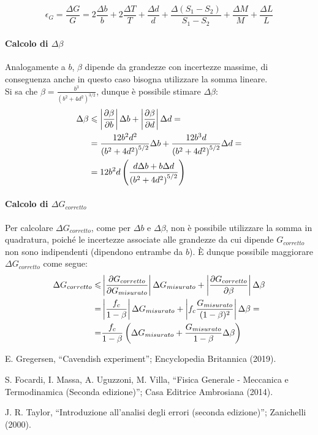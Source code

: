 \documentclass{article}
\newcommand{\quotes}[1]{``#1''}
\newcommand{\abs}[1]{\left| #1 \right|}
\begin{document}
\begin{equation}
    \epsilon_G = \frac{\Delta G}{G} = 2 \frac{\Delta b}{b} + 2 \frac{\Delta T}{T} + \frac{\Delta d}{d} + \frac{\Delta \left( S_1 - S_2 \right)}{S_1 - S_2} + \frac{\Delta M}{M} + \frac{\Delta L}{L}
\end{equation}

\paragraph{Calcolo di $\Delta \beta$}
Analogamente a $b$, $\beta$ dipende da grandezze con incertezze massime, di conseguenza anche in questo caso bisogna utilizzare la somma lineare\cite{taylor}.\\
Si sa che $\displaystyle \beta = \frac{b ^ 3}{\left( b ^ 2 + 4 d ^ 2 \right) ^ {3 / 2}}$, dunque è possibile stimare $\Delta \beta$:
\begin{align}
    \Delta \beta &\leqslant \abs{\frac{\partial \beta}{\partial b}} \Delta b + \abs{\frac{\partial \beta}{\partial d}} \Delta d =\notag\\
    &= \frac{12 b ^ 2 d ^ 2}{\left(b ^ 2 + 4 d ^ 2\right) ^ {5 / 2}} \Delta b + \frac{12 b ^ 3 d}{\left(b ^ 2 + 4 d ^ 2\right) ^ {5 / 2}} \Delta d =\notag\\
    &= 12 b ^ 2 d \left(\frac{d \Delta b + b \Delta d}{\left( b ^ 2 + 4 d ^ 2 \right) ^ {5/2}}\right)
\end{align}

\paragraph{Calcolo di $\Delta G_{corretto}$}
Per calcolare $\Delta G_{corretto}$, come per $\Delta b$ e $\Delta \beta$, non è possibile utilizzare la somma in quadratura, poiché le incertezze associate alle grandezze da cui dipende $G_{corretto}$ non sono indipendenti (dipendono entrambe da $b$).
È dunque possibile maggiorare $\Delta G_{corretto}$ come segue:
\begin{align}
    \Delta G_{corretto} \leqslant& \abs{\frac{\partial G_{corretto}}{\partial G_{misurato}}} \Delta G_{misurato} + \abs{\frac{\partial G_{corretto}}{\partial \beta}} \Delta \beta\notag\\
    =& \abs{\frac{f_c}{1 - \beta}} \Delta G_{misurato} + \abs{f_c \frac{G_{misurato}}{(1 - \beta) ^ 2}} \Delta \beta =\notag\\
    =& \frac{f_c}{1 - \beta} \left( \Delta G_{misurato} + \frac{G_{misurato}}{1 - \beta} \Delta \beta \right)
\end{align}

\begin{thebibliography}{9}
E. Gregersen, \quotes{Cavendish experiment}; Encyclopedia Britannica (2019).

S. Focardi, I. Massa, A. Uguzzoni, M. Villa, \quotes{Fisica Generale - Meccanica e Termodinamica (Seconda edizione)}; Casa Editrice Ambrosiana (2014).

J. R. Taylor, \quotes{Introduzione all'analisi degli errori (seconda edizione)}; Zanichelli (2000).
\end{thebibliography}
\end{document}
